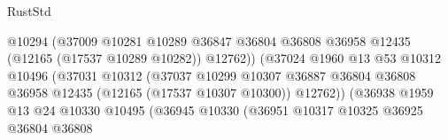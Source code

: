 \begin{lexlean}{RustStd}
\begin{coremodule}
                                                  @10294
                                                  (@37009
                                                    @10281
                                                    @10289
                                                    @36847
                                                    @36804
                                                    @36808
                                                    @36958
                                                    @12435
                                                    (@12165 (@17537 @10289 @10282))
                                                    @12762))
                                                (@37024
                                                  @1960
                                                  @13
                                                  @53
                                                  @10312
                                                  @10496
                                                  (@37031
                                                    @10312
                                                    (@37037
                                                      @10299
                                                      @10307
                                                      @36887
                                                      @36804
                                                      @36808
                                                      @36958
                                                      @12435
                                                      (@12165 (@17537 @10307 @10300))
                                                      @12762))
                                                  (@36938
                                                    @1959
                                                    @13
                                                    @24
                                                    @10330
                                                    @10495
                                                    (@36945
                                                      @10330
                                                      (@36951
                                                        @10317
                                                        @10325
                                                        @36925
                                                        @36804
                                                        @36808

\end{coremodule}
\end{lexlean}
